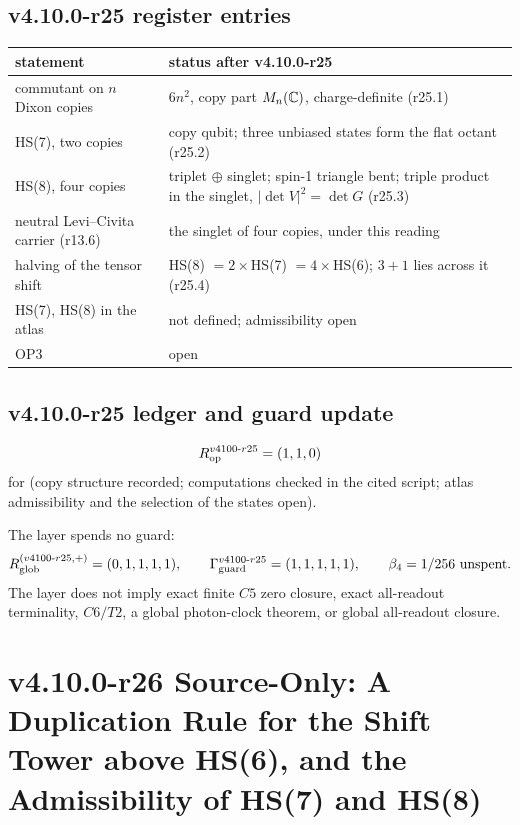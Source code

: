 \subsection*{v4.10.0-r25 register entries}
\label{subsec:v4100-r25-register}

\begin{center}
\small
\begin{tabular}{@{}>{\raggedright\arraybackslash}p{}>{\raggedright\arraybackslash}p{}@{}}
\toprule
statement & status after v4.10.0-r25\\
\midrule
commutant on \(n\) Dixon copies & \(6n^2\), copy part \(M_n(\mathbb C)\), charge-definite (r25.1)\\
HS(7), two copies & copy qubit; three unbiased states form the flat octant (r25.2)\\
HS(8), four copies & triplet \(\oplus\) singlet; spin-1 triangle bent; triple product in the singlet, \(|\det V|^2=\det G\) (r25.3)\\
neutral Levi--Civita carrier (r13.6) & the singlet of four copies, under this reading\\
halving of the tensor shift & HS(8) \(=2\times\)HS(7) \(=4\times\)HS(6); \(3+1\) lies across it (r25.4)\\
HS(7), HS(8) in the atlas & not defined; admissibility open\\
OP3 & open\\
\bottomrule
\end{tabular}
\end{center}

\subsection*{v4.10.0-r25 ledger and guard update}
\label{subsec:v4100-r25-ledger-guard}

\[
R_{\rm op}^{v4100\text{-}r25}=(1,1,0)
\]
for (copy structure recorded; computations checked in the cited script; atlas admissibility and the selection of the states open).

The layer spends no guard:
\[
R_{\rm glob}^{(v4100\text{-}r25,+)}=(0,1,1,1,1),
\qquad
\Gamma_{\rm guard}^{v4100\text{-}r25}=(1,1,1,1,1),
\qquad
\beta_4=1/256\ \text{unspent}.
\]
The layer does not imply exact finite \(C5\) zero closure, exact all-readout terminality, \(C6/T2\), a global photon-clock theorem,
or global all-readout closure.

\clearpage
\section*{v4.10.0-r26 Source-Only: A Duplication Rule for the Shift Tower above HS(6), and the Admissibility of HS(7) and HS(8)}
\label{sec:v4100-r26-hs-duplication}

